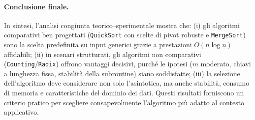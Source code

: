 \documentclass[a4paper, 11pt]{article}
\begin{document}
\paragraph{Conclusione finale.}
In sintesi, l'analisi congiunta teorico--sperimentale mostra che:
(i) gli algoritmi comparativi ben progettati (\texttt{QuickSort} con scelte di pivot robuste e \texttt{MergeSort}) sono la scelta predefinita su input generici grazie a prestazioni \(O(n\log n)\) affidabili; 
(ii) in scenari strutturati, gli algoritmi non comparativi (\texttt{Counting}/\texttt{Radix}) offrono vantaggi decisivi, purché le ipotesi (\(m\) moderato, chiavi a lunghezza fissa, stabilità della subroutine) siano soddisfatte; 
(iii) la selezione dell'algoritmo deve considerare non solo l'asintotica, ma anche stabilità, consumo di memoria e caratteristiche del dominio dei dati. 
Questi risultati forniscono un criterio pratico per scegliere consapevolmente l'algoritmo più adatto al contesto applicativo.
\end{document}
